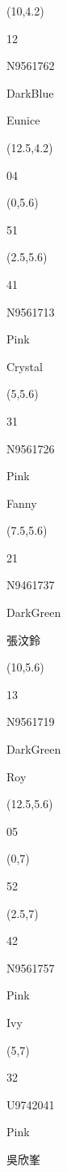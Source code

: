 \documentclass[a4paper]{article}
\newcommand{\myseat}[4]{%
\vspace{-0.1cm}
\parbox[t][2.2cm][t]{3.5cm}{
\small #1 %
\begin{description}
\vspace{-0.1cm}
\item [ID:] #2
\vspace{-0.1cm}
\item [Team:] #3 \normalsize
\vspace{-0.1cm}
\item \normalsize #4
\vspace{-0.1cm}
\end{description}
}
}
\begin{document}
\begin{CJK}{UTF8}{cyberbit}
\begin{textblock}{2.5}(10,4.2)
	\myseat{12}{N9561762}{DarkBlue}{Eunice}
\end{textblock}

\begin{textblock}{2.5}(12.5,4.2)
\textblockcolor{}
	\myseat{04}{}{}{}
\end{textblock}

\begin{textblock}{2.5}(0,5.6)
\textblockcolor{}
\myseat{51}{}{}{}
\end{textblock}

\begin{textblock}{2.5}(2.5,5.6)
\myseat{41}{N9561713}{Pink}{Crystal}
\end{textblock}

\begin{textblock}{2.5}(5,5.6)
\myseat{31}{N9561726}{Pink}{Fanny}
\end{textblock}

\begin{textblock}{2.5}(7.5,5.6)
\myseat{21}{N9461737}{DarkGreen}{張汶鈴}
\end{textblock}

\begin{textblock}{2.5}(10,5.6)
\myseat{13}{N9561719}{DarkGreen}{Roy}
\end{textblock}

\begin{textblock}{2.5}(12.5,5.6)
\textblockcolor{}
\myseat{05}{}{}{}
\end{textblock}

\begin{textblock}{2.5}(0,7)
\textblockcolor{}
\myseat{52}{}{}{}
\end{textblock}

\begin{textblock}{2.5}(2.5,7)
\myseat{42}{N9561757}{Pink}{Ivy}
\end{textblock}

\begin{textblock}{2.5}(5,7)
\myseat{32}{U9742041}{Pink}{吳欣峯}
\end{textblock}


\end{CJK}
\end{document}
